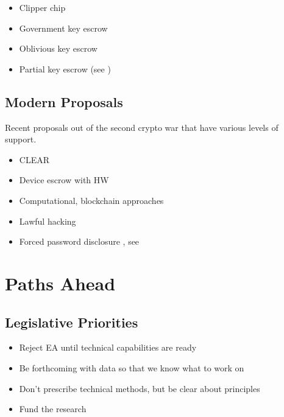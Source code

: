 \begin{itemize}
    \item Clipper chip
    \item Government key escrow
    \item Oblivious key escrow \cite{goos_oblivious_1996}
    \item Partial key escrow (see \cite{denning_taxonomy_1996})
\end{itemize}

\subsection{Modern Proposals}

Recent proposals out of the second crypto war that have various levels of support.

\begin{itemize}
    \item CLEAR \cite{ozzie_2018}
    \item Device escrow with HW \cite{savage_lawful_2018}
    \item Computational, blockchain approaches \cite{phan_key_2017}
    \item Lawful hacking \cite{nguyen_lawful_2017} \cite{soesanto_2018}
    \item Forced password disclosure \cite{bittenbender_2019}, see \cite{kerr_encryption_2017}
\end{itemize}

\section{Paths Ahead}

\subsection{Legislative Priorities}

\begin{itemize}
    \item Reject EA until technical capabilities are ready \cite{varia_2018}
    \item Be forthcoming with data so that we know what to work on \cite{armerding_2017}
    \item Don't prescribe technical methods, but be clear about principles \cite{matyas_incommensurability_2018}
    \item Fund the research \cite{varia_2018}
\end{itemize}


